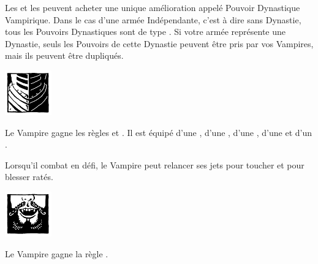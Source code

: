 \newpage
{}

\spaceaftersection{}

Les \vampirelords{} et les \vampireheroes{} peuvent acheter une unique amélioration appelé Pouvoir Dynastique Vampirique. Dans le cas d'une armée Indépendante, c'est à dire sans Dynastie, tous les Pouvoirs Dynastiques sont de type \oneofakind{}. Si votre armée représente une Dynastie, seuls les Pouvoirs de cette Dynastie peuvent être pris par vos Vampires, mais ils peuvent être dupliqués.

\begin{multicols}{2}\raggedcolumns

\begin{center}\includegraphics[width=2cm]{pics/logo_brotherhood.png}\end{center}
\vspace*{-1.2cm}

\startpricelist

 Le Vampire gagne les règles \weaponmaster{} et . Il est équipé d'une \pw{}, d'une \halberd{}, d'une \gw{}, d'une \lance{} et d'un \shield{}.

 Lorsqu'il combat en défi, le Vampire peut relancer ses jets pour toucher et pour blesser ratés.

\endpricelist

\begin{center}\includegraphics[width=2cm]{pics/logo_vonkarnstein.png}\end{center}
\vspace*{-1.2cm}

\startpricelist

 Le Vampire gagne la règle .


\end{multicols}
